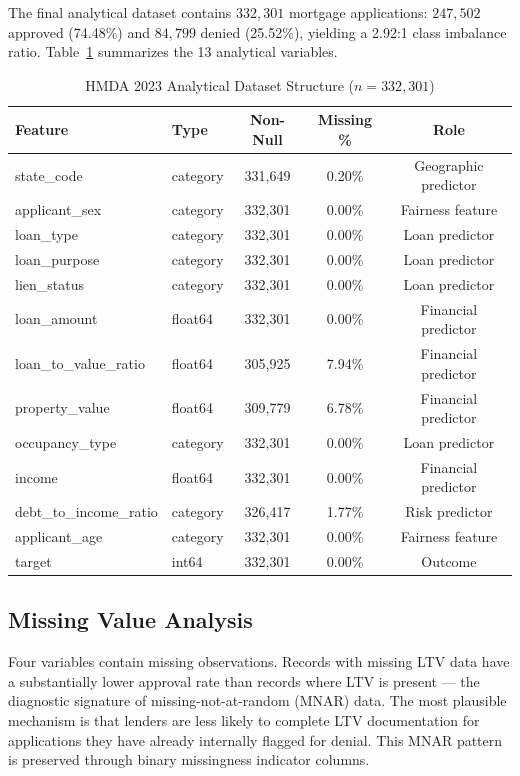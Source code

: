\documentclass[12pt,letterpaper]{article}
\begin{document}
The final analytical dataset contains $332{,}301$ mortgage applications: $247{,}502$ approved
(74.48\%) and $84{,}799$ denied (25.52\%), yielding a 2.92:1 class imbalance ratio.
Table~\ref{tab:dataset} summarizes the 13 analytical variables.

\begin{table}[H]
\centering
\caption{HMDA 2023 Analytical Dataset Structure ($n = 332{,}301$)}
\label{tab:dataset}
\begin{tabular}{llccc}
\toprule
\textbf{Feature} & \textbf{Type} & \textbf{Non-Null} & \textbf{Missing \%} & \textbf{Role} \\
\midrule
state\_code         & category & 331,649 & 0.20\% & Geographic predictor \\
applicant\_sex      & category & 332,301 & 0.00\% & Fairness feature \\
loan\_type          & category & 332,301 & 0.00\% & Loan predictor \\
loan\_purpose       & category & 332,301 & 0.00\% & Loan predictor \\
lien\_status        & category & 332,301 & 0.00\% & Loan predictor \\
loan\_amount        & float64  & 332,301 & 0.00\% & Financial predictor \\
loan\_to\_value\_ratio & float64 & 305,925 & 7.94\% & Financial predictor \\
property\_value     & float64  & 309,779 & 6.78\% & Financial predictor \\
occupancy\_type     & category & 332,301 & 0.00\% & Loan predictor \\
income              & float64  & 332,301 & 0.00\% & Financial predictor \\
debt\_to\_income\_ratio & category & 326,417 & 1.77\% & Risk predictor \\
applicant\_age      & category & 332,301 & 0.00\% & Fairness feature \\
target              & int64    & 332,301 & 0.00\% & Outcome \\
\bottomrule
\end{tabular}
\end{table}

\subsection{Missing Value Analysis}
\label{sec:mnar}

Four variables contain missing observations. Records with missing LTV data have a substantially
lower approval rate than records where LTV is present --- the diagnostic signature of
missing-not-at-random (MNAR) data. The most plausible mechanism is that lenders are less likely
to complete LTV documentation for applications they have already internally flagged for denial.
This MNAR pattern is preserved through binary missingness indicator columns.
\end{document}
